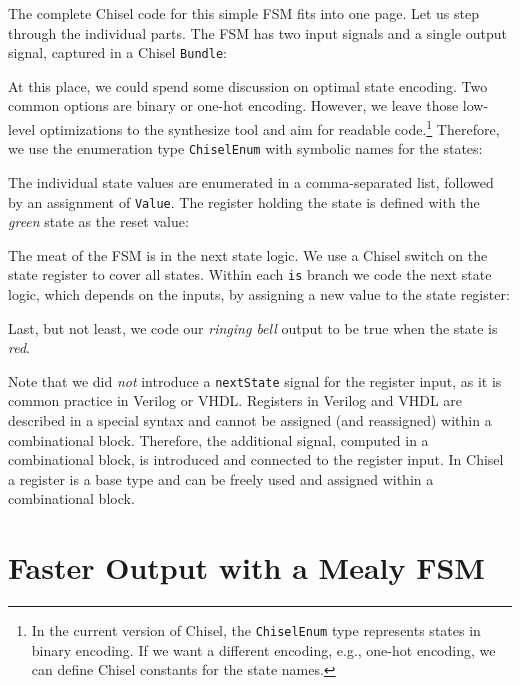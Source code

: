 \documentclass[%
    10pt,
    headinclude, footexclude,
    openright, %
    notitlepage,
    cleardoubleempty,
    headsepline,
    pointlessnumbers,
    bibtotoc, idxtotoc,
    ]{scrbook}
\newcommand{\code}[1]{{\lstinline[basicstyle=\small\ttfamily]{#1}}}
\newcommand{\codefoot}[1]{{\lstinline[basicstyle=\footnotesize\ttfamily]{#1}}}
\begin{document}
The complete Chisel code for this simple FSM fits into one page.
Let us step through the individual parts.
The FSM has two input signals and a single output signal, captured in a Chisel \code{Bundle}:
%


\noindent At this place, we could spend some discussion on optimal state encoding. Two common options
are binary or one-hot encoding. However, we leave those low-level optimizations to
the synthesize tool and aim for readable code.\footnote{In the current version
of Chisel, the \codefoot{ChiselEnum} type represents states in binary encoding.
If we want a different encoding, e.g., one-hot encoding, we can define Chisel
constants for the state names.}
Therefore, we use the enumeration type \code{ChiselEnum} with symbolic names for the states:


\noindent The individual state values are enumerated in a comma-separated list,
followed by an assignment of \code{Value}.
The register holding the state is defined with the \emph{green} state as the reset value:


\noindent The meat of the FSM is in the next state logic. We use a Chisel switch on the
state register to cover all states. Within each \code{is} branch we code the next state
logic, which depends on the inputs, by assigning a new value to the state register:


\noindent Last, but not least, we code our \emph{ringing bell} output to be true when
the state is \emph{red}.


Note that we did \emph{not} introduce a \code{nextState} signal for the register input,
as it is common practice in Verilog or VHDL.
Registers in Verilog and VHDL are described in a special syntax and cannot
be assigned (and reassigned) within a combinational block.
Therefore, the additional signal, computed in a combinational block, is
introduced and connected to the register input.
In Chisel a register is a base type and can be freely used and assigned
within a combinational block.

\section{Faster Output with a Mealy FSM}
\end{document}
